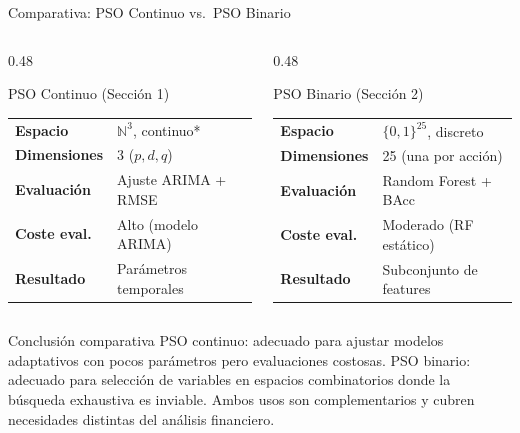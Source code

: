 \documentclass[aspectratio=169]{beamer}
\begin{document}
\begin{frame}{Comparativa: PSO Continuo vs.\ PSO Binario}
  \begin{columns}[T]
    \begin{column}{0.48\textwidth}
      \begin{block}{PSO Continuo (Sección 1)}
        \begin{tabular}{ll}
          \textbf{Espacio} & $\mathbb{N}^3$, continuo* \\
          \textbf{Dimensiones} & 3 ($p, d, q$) \\
          \textbf{Evaluación} & Ajuste ARIMA + RMSE \\
          \textbf{Coste eval.} & Alto (modelo ARIMA) \\
          \textbf{Resultado} & Parámetros temporales \\
        \end{tabular}
      \end{block}
    \end{column}
    \begin{column}{0.48\textwidth}
      \begin{block}{PSO Binario (Sección 2)}
        \begin{tabular}{ll}
          \textbf{Espacio} & $\{0,1\}^{25}$, discreto \\
          \textbf{Dimensiones} & 25 (una por acción) \\
          \textbf{Evaluación} & Random Forest + BAcc \\
          \textbf{Coste eval.} & Moderado (RF estático) \\
          \textbf{Resultado} & Subconjunto de features \\
        \end{tabular}
      \end{block}
    \end{column}
  \end{columns}
  \begin{alertblock}{Conclusión comparativa}
    PSO continuo: adecuado para ajustar modelos adaptativos con pocos parámetros
    pero evaluaciones costosas.
    PSO binario: adecuado para selección de variables en espacios combinatorios
    donde la búsqueda exhaustiva es inviable.
    Ambos usos son complementarios y cubren necesidades distintas del análisis financiero.
  \end{alertblock}
\end{frame}
\end{document}
